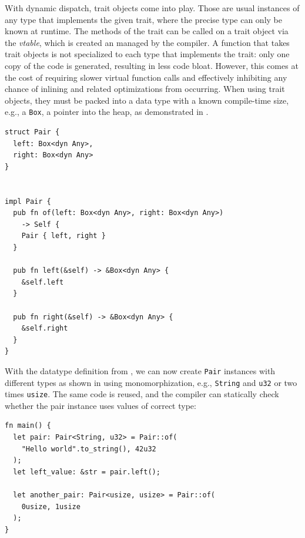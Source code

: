 \documentclass[paper=a4,%
  twoside,%
  BCOR4mm,%
  abstract=true,%
  toc=bibliography,%
  chapterprefix=true,%
  toc=bibliographynumbered,%
  open=right,%
  english,%
  pagesize=pdftex]{scrreprt}
\begin{document}
With dynamic dispatch, trait objects come into play. Those are usual instances of any type that implements the given trait, where the precise type can only be known at runtime. The methods of the trait can be called on a trait object via the \emph{vtable}, which is created an managed by the compiler. A function that takes trait objects is not specialized to each type that implements the trait: only one copy of the code is generated, resulting in less code bloat. However, this comes at the cost of requiring slower virtual function calls and effectively inhibiting any chance of inlining and related optimizations from occurring. When using trait objects, they must be packed into a data type with a known compile-time size, e.g., a \texttt{Box}, a pointer into the heap, as demonstrated in .

\begin{lstlisting}[style=boxed, caption=A data type with dynamic dispatch, label=lst:dynamic-dispatch]
struct Pair {
  left: Box<dyn Any>,
  right: Box<dyn Any>
}


impl Pair {
  pub fn of(left: Box<dyn Any>, right: Box<dyn Any>)
    -> Self {
    Pair { left, right }
  }

  pub fn left(&self) -> &Box<dyn Any> {
    &self.left
  }

  pub fn right(&self) -> &Box<dyn Any> {
    &self.right
  }
}
\end{lstlisting}

With the datatype definition from , we can now create \texttt{Pair} instances with different types as shown in  using monomorphization, e.g., \texttt{String} and \texttt{u32} or two times \texttt{usize}. The same code is reused, and the compiler can statically check whether the pair instance uses values of correct type:
\begin{lstlisting}[style=boxed, caption={}, label=lst:example-generics-usage]
fn main() {
  let pair: Pair<String, u32> = Pair::of(
    "Hello world".to_string(), 42u32
  );
  let left_value: &str = pair.left();

  let another_pair: Pair<usize, usize> = Pair::of(
    0usize, 1usize
  );
}
\end{lstlisting}
\end{document}
